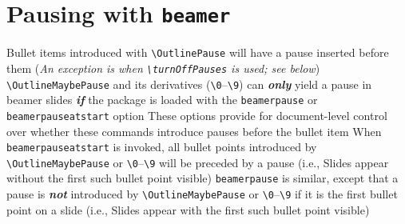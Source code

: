 \documentclass[11pt]{article}
\begin{document}
\section{Pausing with \texttt{beamer}}\label{sec:pausing}
\1 Bullet items introduced with \verb+\OutlinePause+ will have a pause inserted before them
	\2 ({\itshape An exception is when \verb+\turnOffPauses+ is used; see below})
\1 \verb+\OutlineMaybePause+ and its derivatives (\verb+\0+--\verb+\9+) can \textbf{\textit{only}} yield a pause in beamer slides \textbf{\textit{if}} the package is loaded with the \verb+beamerpause+ or \verb+beamerpauseatstart+ option 
	\2 These options provide for document-level control over whether these commands introduce pauses before the bullet item
	\2 When \verb+beamerpauseatstart+ is invoked, all bullet points introduced by \verb+\OutlineMaybePause+ or \verb+\0+--\verb+\9+ will be preceded by a pause
		\3 (i.e., Slides appear without the first such bullet point visible)
	\2 \verb+beamerpause+ is similar, except that a pause is \textbf{\textit{not}} introduced by \verb+\OutlineMaybePause+ or \verb+\0+--\verb+\9+ if it is the first bullet point on a slide
		\3 (i.e., Slides appear with the first such bullet point visible)
\end{document}
